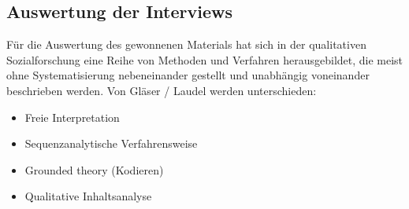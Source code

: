 \subsection{Auswertung der Interviews}
Für die Auswertung des gewonnenen Materials hat sich in der qualitativen Sozialforschung eine Reihe von Methoden und Verfahren herausgebildet, die meist ohne Systematisierung nebeneinander gestellt und unabhängig voneinander beschrieben werden. Von Gläser / Laudel werden unterschieden:
\begin{itemize} \itemsep1pt \parskip0pt 
\item Freie Interpretation
\item Sequenzanalytische Verfahrensweise
\item Grounded theory (Kodieren)
\item Qualitative Inhaltsanalyse
\end{itemize}

